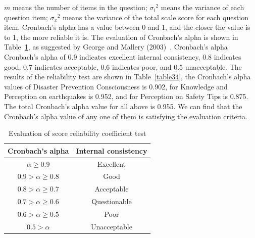 $m$ means the number of items in the question; ${\sigma_i}^2$ means the variance of each question item; ${\sigma_x}^2$ means the variance of the total scale score for each question item. Cronbach's alpha has a value between 0 and 1, and the closer the value is to 1, the more reliable it is. The evaluation of Cronbach's alpha is shown in Table~\ref{fig24}, as suggested by George and Mallery (2003)~\cite{ref1}. Cronbach's alpha  Cronbach's alpha of 0.9 indicates excellent internal consistency, 0.8 indicates good, 0.7 indicates acceptable, 0.6 indicates poor, and 0.5 unacceptable. The results of the reliability test are shown in Table~\ref{table34}, the Cronbach's alpha values of Disaster Prevention Consciousness is 0.902, for Knowledge and Perception on earthquakes is 0.952, and for Perception on Safety Tips is 0.875. The total Cronbach's alpha value for all above is 0.955. We can find that the Cronbach's alpha value of any one of them is satisfying the evaluation criteria.

\begin{table}[h]
  \caption{Evaluation of score reliability coefficient test}
  \label{fig24}
  \centering
\begin{tabular}{cc}
\hline
Cronbach's alpha & Internal consistency \\
\hline
$\alpha \geq 0.9$ & Excellent \\
$0.9>\alpha \geq 0.8$ & Good \\
$0.8>\alpha \geq 0.7$ & Acceptable \\
$0.7>\alpha \geq 0.6$ & Questionable \\
$0.6>\alpha \geq 0.5$ & Poor \\
$0.5>\alpha$ & Unacceptable \\
\hline
\end{tabular}
\end{table}



